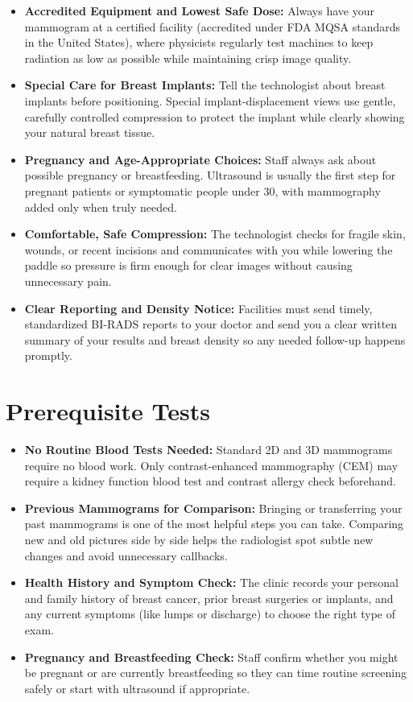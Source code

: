\begin{itemize}
    \item \textbf{Accredited Equipment and Lowest Safe Dose:} Always have your mammogram at a certified facility (accredited under FDA MQSA standards in the United States), where physicists regularly test machines to keep radiation as low as possible while maintaining crisp image quality.
    \item \textbf{Special Care for Breast Implants:} Tell the technologist about breast implants before positioning. Special implant-displacement views use gentle, carefully controlled compression to protect the implant while clearly showing your natural breast tissue.
    \item \textbf{Pregnancy and Age-Appropriate Choices:} Staff always ask about possible pregnancy or breastfeeding. Ultrasound is usually the first step for pregnant patients or symptomatic people under 30, with mammography added only when truly needed.
    \item \textbf{Comfortable, Safe Compression:} The technologist checks for fragile skin, wounds, or recent incisions and communicates with you while lowering the paddle so pressure is firm enough for clear images without causing unnecessary pain.
    \item \textbf{Clear Reporting and Density Notice:} Facilities must send timely, standardized BI-RADS reports to your doctor and send you a clear written summary of your results and breast density so any needed follow-up happens promptly.
\end{itemize}

\section{Prerequisite Tests}

\begin{itemize}
    \item \textbf{No Routine Blood Tests Needed:} Standard 2D and 3D mammograms require no blood work. Only contrast-enhanced mammography (CEM) may require a kidney function blood test and contrast allergy check beforehand.
    \item \textbf{Previous Mammograms for Comparison:} Bringing or transferring your past mammograms is one of the most helpful steps you can take. Comparing new and old pictures side by side helps the radiologist spot subtle new changes and avoid unnecessary callbacks.
    \item \textbf{Health History and Symptom Check:} The clinic records your personal and family history of breast cancer, prior breast surgeries or implants, and any current symptoms (like lumps or discharge) to choose the right type of exam.
    \item \textbf{Pregnancy and Breastfeeding Check:} Staff confirm whether you might be pregnant or are currently breastfeeding so they can time routine screening safely or start with ultrasound if appropriate.
\end{itemize}

